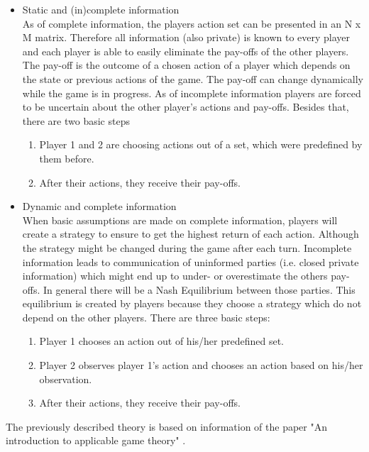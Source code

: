 \begin{itemize}
	\item Static and (in)complete information\\
	As of complete information, the players action set can be presented in an N x M matrix.
	Therefore all information (also private) is known to every player and each player is able to easily eliminate the pay-offs of the 		
	other players. The pay-off is the outcome of a chosen action of a player which depends on the state or previous actions of 
	the game. The pay-off can change dynamically while the game is in progress.
	As of incomplete information players are forced to be uncertain about the other player's actions and pay-offs.
	Besides that, there are two basic steps
	\begin{enumerate}
		\item Player 1 and 2 are choosing actions out of a set, which were predefined by them before.
		\item After their actions, they receive their pay-offs.
	\end{enumerate}
	\item Dynamic and complete information\\
	When basic assumptions are made on complete information, players will create a strategy to ensure to get the highest return 		
	of each action. Although the strategy might be changed during the game after each turn.
	Incomplete information leads to communication of uninformed parties (i.e. closed private 
	information) which might end up to under- or overestimate the others pay-offs. In general there will be a Nash Equilibrium 
	between those parties. This equilibrium is created by players because they choose a strategy which do not depend on the other 	players. There are three basic steps: 
	\begin{enumerate}
		\item Player 1 chooses an action out of his/her predefined set.
		\item Player 2 observes player 1's action and chooses an action based on his/her observation.
		\item After their actions, they receive their pay-offs.
	\end{enumerate}
\end{itemize}

The previously described theory is based on information of the paper "An introduction to applicable game theory" \cite {gibbons1997gametheory}.

